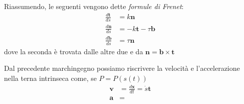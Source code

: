 Riassumendo, le seguenti vengono dette \emph{formule di Frenet}:
\begin{align*}
    \frac{d\mathbf{t} }{ds} &= k \mathbf{n}  \\
    \frac{d\mathbf{n} }{ds} &= -k \mathbf{t}  - \tau \mathbf{b}  \\
    \frac{d\mathbf{b} }{ds} &= \tau \mathbf{n}
\end{align*}
dove la seconda è trovata dalle altre due e da \(\mathbf{n} = \mathbf{b} \times
\mathbf{t} \) 

Dal precedente marchingegno possiamo riscrivere la velocità e l'accelerazione
nella terna intrinseca come, se \(P = P{(s{(t)})}\) 
\begin{align*}
    \mathbf{v}  &= \frac{d\mathbf{x} }{dt} = \dot{s} \mathbf{t}\\
    \mathbf{a} &= %
\end{align*}





